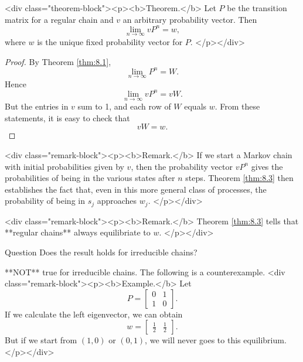 <div class="theorem-block"><p><b>Theorem.</b> 
\label{thm:8.3}
Let $P$ be the transition matrix for a regular chain and $v$ an arbitrary probability vector. Then
$$\begin{equation}
    \lim_{n\to\infty} vP^n = w,
\end{equation}$$
where $w$ is the unique fixed probability vector for $P$.
</p></div>

\begin{proof}
By Theorem \ref{thm:8.1},
$$\begin{equation}
    \lim_{n\to\infty} P^n = W.
\end{equation}$$
Hence 
$$\begin{equation}
    \lim_{n\to\infty} vP^n = vW.
\end{equation}$$
But the entries in $v$ sum to 1, and each row of $W$ equals $w$. From these statements, it is easy to check that
$$\begin{equation}
    vW = w.
\end{equation}$$
\end{proof}

<div class="remark-block"><p><b>Remark.</b> 
If we start a Markov chain with initial probabilities given by $v$, then the probability vector $v P^n$ gives the probabilities of being in the various states after $n$ steps. Theorem \ref{thm:8.3} then establishes the fact that, even in this more general class of processes, the probability of being in $s_j$ approaches $w_j$.
</p></div>

<div class="remark-block"><p><b>Remark.</b> 
Theorem \ref{thm:8.3} tells that **regular chains** always equilibriate to $w$.
</p></div>

\begin{newnotion}{Question}
Does the result holds for irreducible chains?
\end{newnotion}
**NOT** true for irreducible chains. The following is a counterexample.
<div class="remark-block"><p><b>Example.</b> 
Let 
$$\begin{equation}
    P = \begin{bmatrix} 0 & 1 \\ 1 & 0 \end{bmatrix}.
\end{equation}$$
If we calculate the left eigenvector, we can obtain 
$$\begin{equation}
    w = \begin{bmatrix} \frac{1}{2} & \frac{1}{2} \end{bmatrix}.
\end{equation}$$
But if we start from $(1,0)$ or $(0,1)$, we will never goes to this equilibrium.
</p></div>

